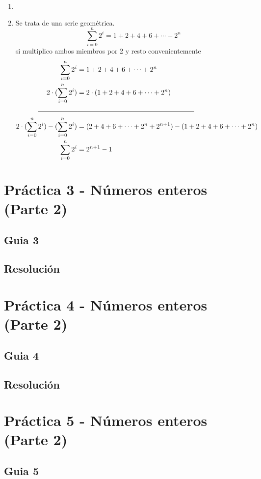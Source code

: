 \documentclass[12pt]{book}
\begin{document}
\begin{enumerate}
\item %
\item %
Se trata de una serie geom\'etrica.
\[ \sum_{i=0}^{n} 2^i = 1+2+4+6+\cdots+2^n\] si multiplico ambos miembros por 2 y resto convenientemente
\begin{align*}
 \sum_{i=0}^{n} 2^i &= 1+2+4+6+\cdots+2^n  \\
  2 \cdot (\sum_{i=0}^{n} 2^i) &= 2\cdot(1+2+4+6+\cdots+2^n) \\
  \rule{20mm}{0.2mm} &  \rule{60mm}{0.2mm} \\
 2 \cdot (\sum_{i=0}^{n} 2^i)-  (\sum_{i=0}^{n} 2^i)  &= (2+4+6+ \cdots +2^n+2^{n+1}) - (1+2+4+6+ \cdots +2^n) \\
 \sum_{i=0}^{n} 2^i &= 2^{n+1} -1
\end{align*}
\end{enumerate}


\chapter{Práctica 3 - Números enteros (Parte 2)}
\section{Guia 3}
%


\section{Resoluci\'on}



\chapter{Práctica 4 - Números enteros (Parte 2)}
\section{Guia 4}
%


\section{Resoluci\'on}


\chapter{Práctica 5 - Números enteros (Parte 2)}
\section{Guia 5}
%
\end{document}
